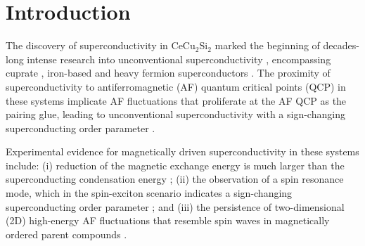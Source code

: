\documentclass[aps,prl,onecolumn,amsmath,amssymb,superscriptaddress]{revtex4}
\begin{document}
\section{Introduction}
The discovery of superconductivity in CeCu$_2$Si$_2$ \cite{FSteglich} marked the beginning of decades-long intense research into unconventional superconductivity \cite{DJScalapino2012,GStewart2017}, encompassing cuprate \cite{PALee2006,BKeimer2015,Sidis}, iron-based \cite{GStewart2011,PDai2015,RMFernandes2014,QMSi2016} and heavy fermion superconductors \cite{CPfleiderer2009,OStockert2012,BDWhite2015}. The proximity of superconductivity to antiferromagnetic (AF) quantum critical points (QCP) in these systems implicate AF fluctuations that proliferate at the AF QCP as the pairing glue, leading to unconventional superconductivity with a sign-changing superconducting order parameter \cite{DJScalapino2012,TMoriya2003,GStewart2017}. 


Experimental evidence for magnetically driven superconductivity in these systems include: (i) reduction of the magnetic exchange energy is much larger than the superconducting condensation energy \cite{ EDemler1998,HWoo2006,CStock2008,OStockert2011,MWang2013,JLeiner2014,SCarr2016,TDahm2009}; (ii) the observation of a spin resonance mode, which in the spin-exciton scenario indicates a sign-changing superconducting order parameter \cite{DJScalapino2012,MEschrig2006,GYu2009,weber2019}; and (iii) the persistence of two-dimensional (2D) high-energy AF fluctuations that resemble spin waves in magnetically ordered parent compounds \cite{RJBirgeneau2006,OJLipscombe2007,MFujita2012,MLeTacon2011,MLeTacon2013,MPMDean2013,MLiu2012,KJZhou2013,MWang2013}. 
\end{document}
